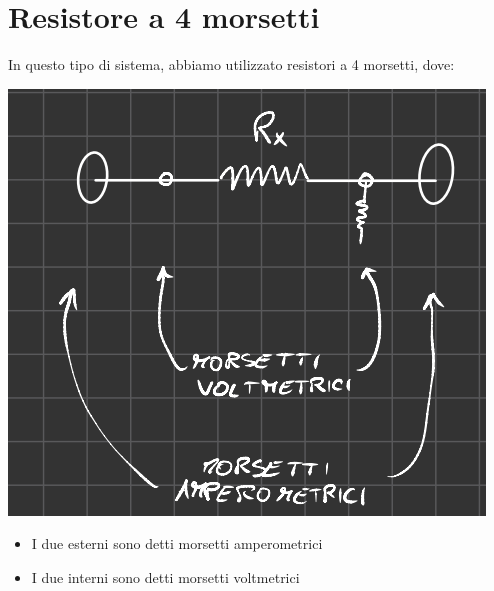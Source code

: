 \section{Resistore a 4 morsetti}
In questo tipo di sistema, abbiamo utilizzato resistori a 4 morsetti, dove:
\begin{center}
    \includegraphics[width=.2\textwidth]{Images/figure44.png}
\end{center}
\begin{itemize}
    \item I due esterni sono detti morsetti amperometrici
    \item I due interni sono detti morsetti voltmetrici
\end{itemize}


